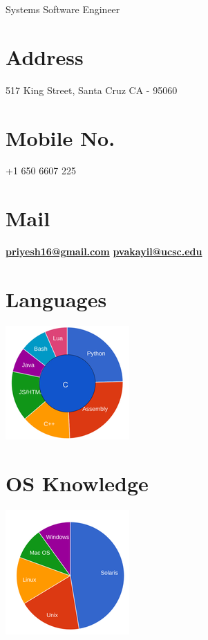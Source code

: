 \documentclass[]{priyesh-cv}
\begin{document}
 {Systems Software Engineer}
      

\begin{aside}
  \section{Address}
    517 King Street, 
    Santa Cruz CA - 95060
    ~
  \section{Mobile No.}
    +1 650 6607 225
    ~
  \section{Mail}
    \href{mailto:priyesh16@gmail.com}{\textbf{priyesh16@gmail.com}}
    \href{mailto:pvakayil@ucsc.edu}{\textbf{pvakayil@ucsc.edu}}
    ~
    \vspace{70pt}
  \section{Languages}
    \vspace{10pt}
    \includegraphics[scale=0.62]{img/test.png}
    ~
  \section{OS Knowledge}
    \includegraphics[scale=0.62]{img/os.png}
    ~

\end{aside}
\end{document}
